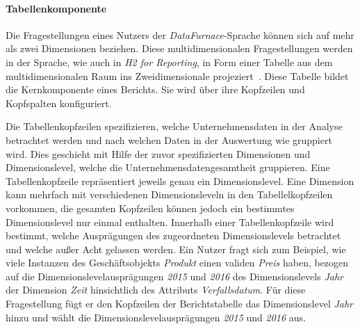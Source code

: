 \documentclass[
  language=german, %
  type=bachelor,%
  ngerman
]{isthesis}
\begin{document}
\begin{content}
  \paragraph{Tabellenkomponente}\label{paragraph:tabellenkomponente} 
  Die Fragestellungen eines Nutzers der \textit{DataFurnace}-Sprache können
  sich auf mehr als zwei Dimensionen beziehen. Diese multidimensionalen
  Fragestellungen werden in der Sprache, wie auch in \textit{H2 for Reporting},
  in Form einer Tabelle aus dem multidimensionalen Raum ins Zweidimensionale
  projeziert~\cite[][S.  23]{becker2007h2}. Diese Tabelle bildet die
  Kernkomponente eines Berichts.  Sie wird über ihre Kopfzeilen und Kopfspalten
  konfiguriert.

  Die Tabellenkopfzeilen spezifizieren, welche Unternehmensdaten in der Analyse
  betrachtet werden und nach welchen Daten in der Auswertung wie gruppiert wird. Dies
  geschieht mit Hilfe der zuvor spezifizierten Dimensionen und Dimensionslevel,
  welche die Unternehmensdatengesamtheit gruppieren. Eine Tabellenkopfzeile
  repräsentiert jeweils genau ein Dimensionslevel. Eine Dimension kann mehrfach
  mit verschiedenen Dimensionsleveln in den Tabellelkopfzeilen vorkommen, die gesamten
  Kopfzeilen können jedoch ein bestimmtes Dimensionslevel nur einmal enthalten.
  Innerhalb einer Tabellenkopfzeile wird bestimmt, welche Ausprägungen des
  zugeordneten Dimensionslevels betrachtet und welche außer Acht gelassen
  werden. Ein Nutzer fragt sich zum Beispiel, wie viele Instanzen des
  Geschäftsobjekts \textit{Produkt} einen validen \textit{Preis} haben, bezogen
  auf die Dimensionslevelausprägungen \textit{2015} und \textit{2016} des
  Dimensionslevels \textit{Jahr} der Dimension \textit{Zeit} hinsichtlich des
  Attributs \textit{Verfallsdatum}. Für diese Fragestellung fügt er den
  Kopfzeilen der Berichtstabelle das Dimensionslevel \textit{Jahr} hinzu und
  wählt die Dimensionslevelausprägungen \textit{2015} und \textit{2016} aus.


\end{content}
\end{document}
